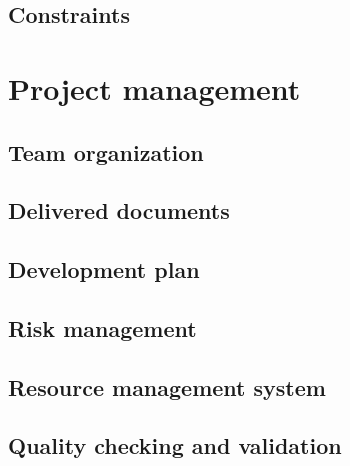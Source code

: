 \documentclass{report}
\begin{document}
\section{Constraints}

\chapter{Project management}

\section{Team organization}

\section{Delivered documents}

\section{Development plan}

\section{Risk management}

\section{Resource management system}

\section{Quality checking and validation}
\end{document}
